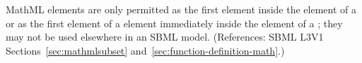 MathML  elements are only permitted as the first element
inside the  element of a \FunctionDefinition or as the
first element of a  element immediately inside the
 element of a \FunctionDefinition; they may not be used
elsewhere in an SBML model.  (References: SBML 
L3V1 Sections~\ref{sec:mathmlsubset} and~\ref{sec:function-definition-math}.)

